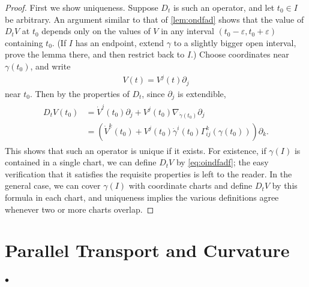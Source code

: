 \documentclass[12pt]{article} %
\begin{document}
\begin{proof}
First we show uniqueness. Suppose $D_{t}$ is such an operator, and let $t_{0} \in I$ be arbitrary. An argument similar to that of \cref{lem:ondfad} shows that the value of $D_{t} V$ at $t_{0}$ depends only on the values of $V$ in any interval $\left(t_{0}-\varepsilon, t_{0}+\varepsilon\right)$ containing $t_{0}$. (If $I$ has an endpoint, extend $\gamma$ to a slightly bigger open interval, prove the lemma there, and then restrict back to $I$.) Choose coordinates near $\gamma\left(t_{0}\right)$, and write
\begin{align*}
V(t)=V^{j}(t) \partial_{j}
\end{align*}
near $t_{0}$. Then by the properties of $D_{t}$, since $\partial_{j}$ is extendible,
\begin{align}
\begin{aligned}
D_{t} V\left(t_{0}\right) &=\dot{V}^{j}\left(t_{0}\right) \partial_{j}+V^{j}\left(t_{0}\right) \nabla_{\dot{\gamma}\left(t_{0}\right)} \partial_{j} \\
&=\left(\dot{V}^{k}\left(t_{0}\right)+V^{j}\left(t_{0}\right) \dot{\gamma}^{i}\left(t_{0}\right) \Gamma_{i j}^{k}\left(\gamma\left(t_{0}\right)\right)\right) \partial_{k} .\label{eq:oindfadf}
\end{aligned}
\end{align}
This shows that such an operator is unique if it exists.
For existence, if $\gamma(I)$ is contained in a single chart, we can define $D_{t} V$ by \cref{eq:oindfadf}; the easy verification that it satisfies the requisite properties is left to the reader. In the general case, we can cover $\gamma(I)$ with coordinate charts and define $D_{t} V$ by this formula in each chart, and uniqueness implies the various definitions agree whenever two or more charts overlap.
\end{proof}
\section{Parallel Transport and Curvature}
$\bullet$ 
\end{document}
